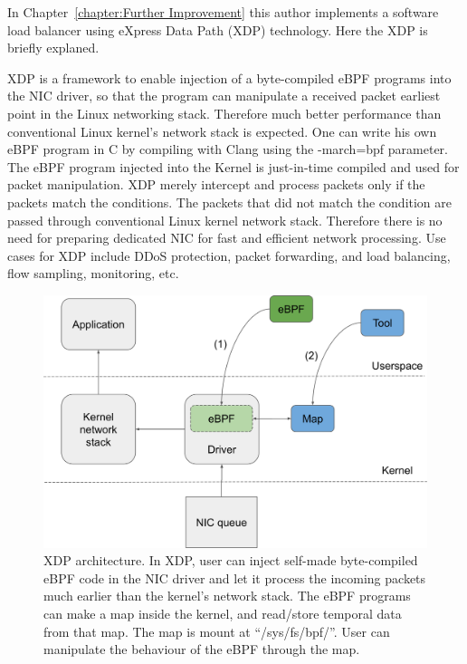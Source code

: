 In Chapter~\ref{chapter:Further Improvement} this author implements a software load balancer using eXpress Data Path (XDP) \cite{hoiland2018express} technology.
Here the XDP is briefly explaned.

XDP is a framework to enable injection of a byte-compiled eBPF programs into the NIC driver, so that the program can manipulate a received packet earliest point in the Linux networking stack.
Therefore much better performance than conventional Linux kernel's network stack is expected.
One can write his own eBPF program in C by compiling with Clang using the -march=bpf parameter.
The eBPF program injected into the Kernel is just-in-time compiled and used for packet manipulation.
XDP merely intercept and process packets only if the packets match the conditions.
The packets that did not match the condition are passed through conventional Linux kernel network stack.
Therefore there is no need for preparing dedicated NIC for fast and efficient network processing.
Use cases for XDP include DDoS protection, packet forwarding, and load balancing, flow sampling, monitoring, etc.

\begin{figure}[h]
  \centering
  \includegraphics[width=0.9\columnwidth]{Figs/xdp-schem}

  \par\bigskip
  \centering
  \begin{minipage}{0.9\columnwidth}
    \caption[XDP architecture]{
      XDP architecture.
      In XDP, user can inject self-made byte-compiled eBPF code in the NIC driver and let it process the incoming packets much earlier than the kernel's network stack.
      The eBPF programs can make a map inside the kernel, and read/store temporal data from that map.
      The map is mount at \enquote{/sys/fs/bpf/}.
      User can manipulate the behaviour of the eBPF through the map.
    }
    \label{fig:xdp-schem}
  \end{minipage}
\end{figure}

